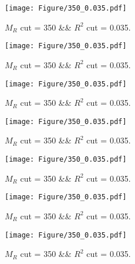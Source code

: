  
\begin{figure}[H] 
\begin{center} 
\texttt{[image: Figure/350\_0.035.pdf]} 
\caption{$M_R$ cut = 350 \&\& $R^2$ cut = 0.035.} 
\label{Fig:350_0.035} 
\end{center} 
\end{figure} 
 
 
\begin{figure}[H] 
\begin{center} 
\texttt{[image: Figure/350\_0.035.pdf]} 
\caption{$M_R$ cut = 350 \&\& $R^2$ cut = 0.035.} 
\label{Fig:350_0.035} 
\end{center} 
\end{figure} 
 
 
\begin{figure}[H] 
\begin{center} 
\texttt{[image: Figure/350\_0.035.pdf]} 
\caption{$M_R$ cut = 350 \&\& $R^2$ cut = 0.035.} 
\label{Fig:350_0.035} 
\end{center} 
\end{figure} 
 
 
\begin{figure}[H] 
\begin{center} 
\texttt{[image: Figure/350\_0.035.pdf]} 
\caption{$M_R$ cut = 350 \&\& $R^2$ cut = 0.035.} 
\label{Fig:350_0.035} 
\end{center} 
\end{figure} 
 
 
\begin{figure}[H] 
\begin{center} 
\texttt{[image: Figure/350\_0.035.pdf]} 
\caption{$M_R$ cut = 350 \&\& $R^2$ cut = 0.035.} 
\label{Fig:350_0.035} 
\end{center} 
\end{figure} 
 
 
\begin{figure}[H] 
\begin{center} 
\texttt{[image: Figure/350\_0.035.pdf]} 
\caption{$M_R$ cut = 350 \&\& $R^2$ cut = 0.035.} 
\label{Fig:350_0.035} 
\end{center} 
\end{figure} 
 
 
\begin{figure}[H] 
\begin{center} 
\texttt{[image: Figure/350\_0.035.pdf]} 
\caption{$M_R$ cut = 350 \&\& $R^2$ cut = 0.035.} 
\label{Fig:350_0.035} 
\end{center} 
\end{figure} 
 
 
